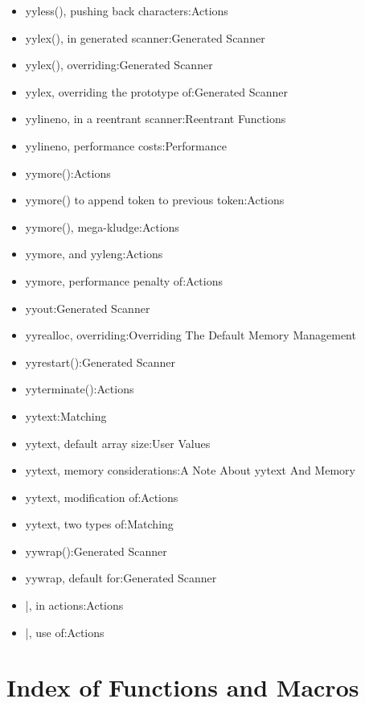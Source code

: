 \documentclass[openany,oneside]{book}
\begin{document}
\begin{itemize}
\item yyless(), pushing back characters:Actions
\item yylex(), in generated scanner:Generated Scanner
\item yylex(), overriding:Generated Scanner
\item yylex, overriding the prototype of:Generated Scanner
\item yylineno, in a reentrant scanner:Reentrant Functions
\item yylineno, performance costs:Performance
\item yymore():Actions
\item yymore() to append token to previous token:Actions
\item yymore(), mega-kludge:Actions
\item yymore, and yyleng:Actions
\item yymore, performance penalty of:Actions
\item yyout:Generated Scanner
\item yyrealloc, overriding:Overriding The Default Memory Management
\item yyrestart():Generated Scanner
\item yyterminate():Actions
\item yytext:Matching
\item yytext, default array size:User Values
\item yytext, memory considerations:A Note About yytext And Memory
\item yytext, modification of:Actions
\item yytext, two types of:Matching
\item yywrap():Generated Scanner
\item yywrap, default for:Generated Scanner
\item |, in actions:Actions
\item |, use of:Actions
\end{itemize}

\section{Index of Functions and Macros}
\end{document}
